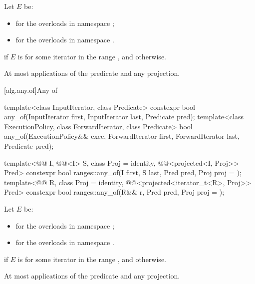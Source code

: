 \begin{itemdescr}
\pnum
Let $E$ be:
\begin{itemize}
\item
   for the overloads in namespace ;
\item
  for the overloads in namespace .
\end{itemize}

\pnum
\returns
{} if $E$ is 
for some iterator  in the range , and
 otherwise.

\pnum
\complexity
At most  applications of the predicate and any projection.
\end{itemdescr}

[alg.any.of]{Any of}

%
\begin{itemdecl}
template<class InputIterator, class Predicate>
  constexpr bool any_of(InputIterator first, InputIterator last, Predicate pred);
template<class ExecutionPolicy, class ForwardIterator, class Predicate>
  bool any_of(ExecutionPolicy&& exec, ForwardIterator first, ForwardIterator last,
              Predicate pred);

template<@@ I, @@<I> S, class Proj = identity,
         @@<projected<I, Proj>> Pred>
  constexpr bool ranges::any_of(I first, S last, Pred pred, Proj proj = {});
template<@@ R, class Proj = identity,
         @@<projected<iterator_t<R>, Proj>> Pred>
  constexpr bool ranges::any_of(R&& r, Pred pred, Proj proj = {});
\end{itemdecl}

\begin{itemdescr}
\pnum
Let $E$ be:
\begin{itemize}
\item
   for the overloads in namespace ;
\item
  for the overloads in namespace .
\end{itemize}

\pnum
\returns
{} if $E$ is  for some iterator 
in the range , and  otherwise.

\pnum
\complexity
At most  applications of the predicate
and any projection.
\end{itemdescr}

